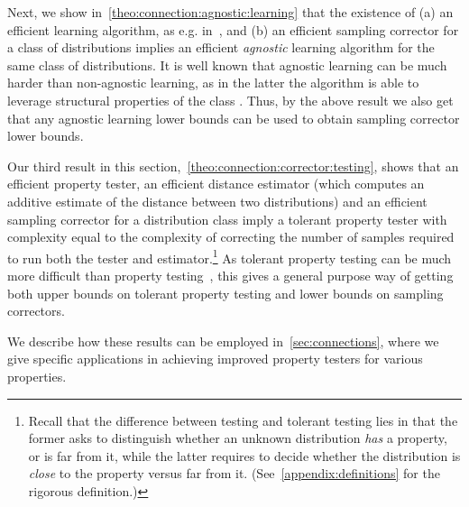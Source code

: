 Next, we show in~\cref{theo:connection:agnostic:learning} that the existence of \textsf{(a)} an efficient
learning algorithm, as e.g. in~\cite{ILR:12,CDSS:13,DDS:PBD:12,DDOST:13}, and \textsf{(b)} an efficient sampling
corrector for a class of distributions implies an efficient 
 \emph{agnostic} learning
algorithm for the same class of distributions.
It is well known that agnostic learning 
can be much harder than non-agnostic learning, 
as in the latter the algorithm is able to leverage structural properties of the class \class. Thus, by the above result we also get that any agnostic learning lower bounds can be used to obtain sampling corrector lower bounds.


Our third result in this section,~\cref{theo:connection:corrector:testing}, shows that an efficient property tester, 
an efficient distance estimator (which computes an additive estimate of the distance between two distributions) and an efficient sampling corrector for
a distribution class imply a tolerant property tester with complexity
equal to the complexity of correcting the number of samples required to run both the tester and estimator.\footnote{Recall that the difference between  testing and tolerant testing lies in that the former asks to distinguish whether an unknown distribution \emph{has} a property, or is far from it, while the latter requires to decide whether the distribution is \emph{close} to the property versus far from it. (See~\cref{appendix:definitions} for the rigorous definition.)}
As tolerant property testing can be much more difficult than
property testing~\cite{GRexp:00,BFRSW:10,Paninski:08,ValiantValiant:10lb}, this gives a general purpose way of getting
both upper bounds on tolerant property testing and lower bounds
on sampling correctors.\medskip

\noindent We describe how these results can be employed in~\cref{sec:connections}, where we give 
specific applications in achieving improved property testers for various properties.


